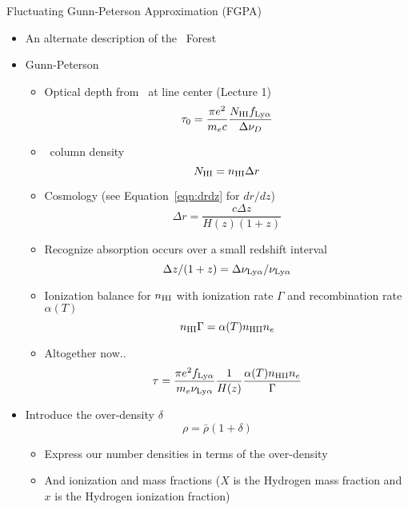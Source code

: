 \documentclass[12pt,letterpaper]{article}
\begin{document}
\begin{Aenumerate}
{\bf \item Fluctuating Gunn-Peterson Approximation (FGPA)}
	\begin{itemize}
	\item An alternate description of the \lya\ Forest
	\item Gunn-Peterson 
		\begin{itemize}
		\item Optical depth from \lya\ at line center (Lecture 1)
		\begin{equation}
		\tau_0 = \frac{\pi e^2}{m_e c} \frac{N_{\rm HI} 
		f_{\rm Ly\alpha}}{\Delta \nu_D}
		\end{equation}
		\item \nhi\ column density
		\begin{equation}
		N_{\rm HI} = n_{\rm HI} \Delta r
		\end{equation}
		\item Cosmology (see Equation~\ref{eqn:drdz} for $dr/dz$)
		\begin{equation}
		\Delta r = \frac{c \Delta z}{H(z) (1+z)}
		\end{equation}
		\item Recognize absorption occurs over a small redshift interval
		\begin{equation}
		\Delta z/(1+z) = \Delta\nu_{\rm Ly\alpha} / \nu_{\rm Ly\alpha}
		\end{equation}
		\item Ionization balance for $n_{\rm HI}$ with ionization rate $\Gamma$
		and recombination rate $\alpha(T)$
		\begin{equation}
		n_{\rm HI} \Gamma = \alpha(T) n_{\rm HII} n_e
		\label{eqn:ion_balance}
		\end{equation}
		\item Altogether now..
		\begin{equation}
		\tau = \frac{\pi e^2 f_{\rm Ly\alpha}}{m_e \nu_{\rm Ly\alpha}}
		\frac{1}{H(z)} \frac{\alpha(T) n_{\rm HII} n_e}{\Gamma}
		\end{equation}
		\end{itemize}
	\item Introduce the over-density $\delta$
	\begin{equation}
	\rho = \bar\rho (1+\delta)
	\label{eqn:overdensity}
	\end{equation}
		\begin{itemize}
		\item Express our number densities in terms of the over-density
		\item And ionization and mass fractions ($X$ is the Hydrogen mass fraction and $x$ is the Hydrogen ionization fraction)

\end{itemize}
\end{itemize}
\end{Aenumerate}
\end{document}
